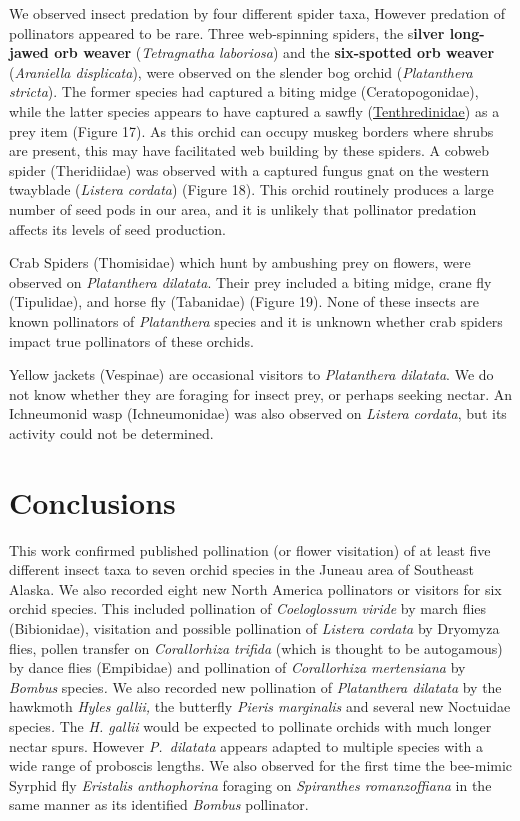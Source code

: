 \begin{multicols}{2}
We observed insect predation by four different spider taxa, However
predation of pollinators appeared to be rare. Three web-spinning
spiders, the s\textbf{ilver long-jawed orb weaver} (\emph{Tetragnatha
laboriosa}) and the \textbf{six-spotted orb weaver} (\emph{Araniella
displicata}), were observed on the slender bog orchid (\emph{Platanthera
stricta}). The former species had captured a biting midge
(Ceratopogonidae), while the latter species appears to have captured a
sawfly
(\href{https://bugguide.net/node/view/13142/bgimage}{Tenthredinidae}) as
a prey item (Figure 17). As this orchid can occupy muskeg borders where
shrubs are present, this may have facilitated web building by these
spiders. A cobweb spider (Theridiidae) was observed with a captured
fungus gnat on the western twayblade (\emph{Listera cordata}) (Figure
18). This orchid routinely produces a large number of seed pods in our
area, and it is unlikely that pollinator predation affects its levels of
seed production.

Crab Spiders (Thomisidae) which hunt by ambushing prey on flowers, were
observed on \emph{Platanthera dilatata}. Their prey included a biting
midge, crane fly (Tipulidae), and horse fly (Tabanidae) (Figure 19).
None of these insects are known pollinators of \emph{Platanthera}
species and it is unknown whether crab spiders impact true pollinators
of these orchids.

Yellow jackets (Vespinae) are occasional visitors to \emph{Platanthera
dilatata}. We do not know whether they are foraging for insect prey, or
perhaps seeking nectar. An Ichneumonid wasp (Ichneumonidae) was also
observed on \emph{Listera cordata}, but its activity could not be
determined.

\section{Conclusions}

This work confirmed published pollination (or flower visitation) of at
least five different insect taxa to seven orchid species in the Juneau
area of Southeast Alaska. We also recorded eight new North America
pollinators or visitors for six orchid species. This included
pollination of \emph{Coeloglossum viride} by march flies (Bibionidae),
visitation and possible pollination of \emph{Listera cordata} by
Dryomyza flies, pollen transfer on \emph{Corallorhiza trifida} (which is
thought to be autogamous) by dance flies (Empibidae) and pollination of
\emph{Corallorhiza mertensiana} by \emph{Bombus} species\emph{.} We also
recorded new pollination of \emph{Platanthera dilatata} by the hawkmoth
\emph{Hyles gallii,} the butterfly \emph{Pieris marginalis} and several
new Noctuidae species\emph{.} The \emph{H. gallii} would be expected to
pollinate orchids with much longer nectar spurs. However \emph{P.\
dilatata} appears adapted to multiple species with a wide range of
proboscis lengths. We also observed for the first time the bee-mimic
Syrphid fly \emph{Eristalis anthophorina} foraging on \emph{Spiranthes
romanzoffiana} in the same manner as its identified \emph{Bombus}
pollinator.


\end{multicols}
